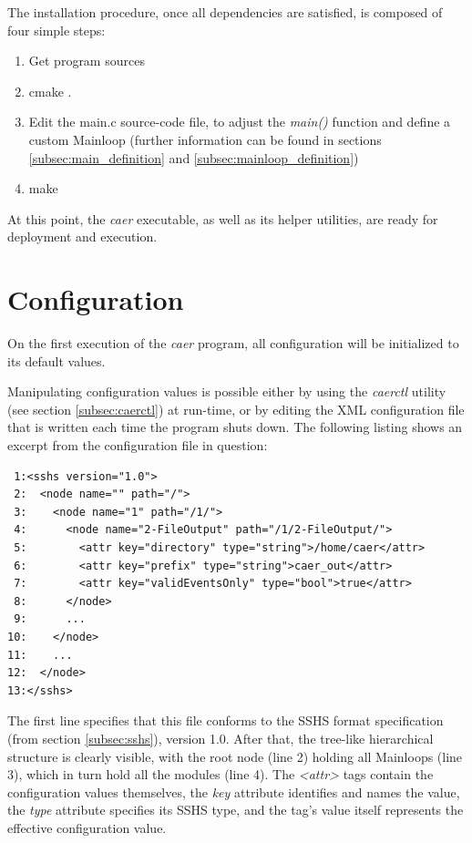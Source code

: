 \documentclass[a4paper,12pt]{report}
\begin{document}
The installation procedure, once all dependencies are satisfied, is composed of four simple steps:
\begin{enumerate}
\item Get program sources
\item cmake .
\item Edit the main.c source-code file, to adjust the \emph{main()} function and define a custom Mainloop (further information can be found in sections \ref{subsec:main_definition} and \ref{subsec:mainloop_definition})
\item make
\end{enumerate}

At this point, the \emph{caer} executable, as well as its helper utilities, are ready for deployment and execution.

\section{Configuration} \label{sec:configuration}

On the first execution of the \emph{caer} program, all configuration will be initialized to its default values.

Manipulating configuration values is possible either by using the \emph{caerctl} utility (see section \ref{subsec:caerctl}) at run-time, or by editing the XML configuration file that is written each time the program shuts down.
\clearpage
The following listing shows an excerpt from the configuration file in question:

\begin{lstlisting}
 1:<sshs version="1.0">
 2:  <node name="" path="/">
 3:    <node name="1" path="/1/">
 4:      <node name="2-FileOutput" path="/1/2-FileOutput/">
 5:        <attr key="directory" type="string">/home/caer</attr>
 6:        <attr key="prefix" type="string">caer_out</attr>
 7:        <attr key="validEventsOnly" type="bool">true</attr>
 8:      </node>
 9:      ...
10:    </node>
11:    ...
12:  </node>
13:</sshs>
\end{lstlisting}

The first line specifies that this file conforms to the SSHS format specification (from section \ref{subsec:sshs}), version 1.0.
After that, the tree-like hierarchical structure is clearly visible, with the root node (line 2) holding all Mainloops (line 3), which in turn hold all the modules (line 4).
The \emph{<attr>} tags contain the configuration values themselves, the \emph{key} attribute identifies and names the value, the \emph{type} attribute specifies its SSHS type, and the tag's value itself represents the effective configuration value.
\end{document}
